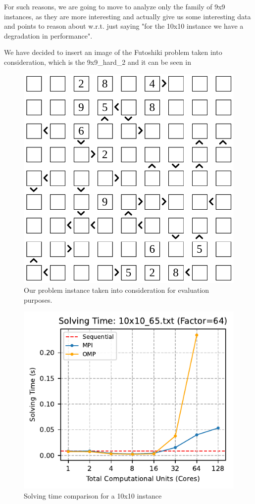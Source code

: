 For such reasons, we are going to move to analyze only the family of 9x9 instances, as they are more interesting and actually give us some interesting data and points to reason about w.r.t. just saying "for the 10x10 instance we have a degradation in performance".

We have decided to insert an image of the Futoshiki problem taken into consideration, which is the 9x9\_hard\_2 and it can be seen in 

\begin{figure}[htbp]
\centering
\includegraphics[width=0.9\linewidth]{imgs/9x9_hard_2_puzzle.png}
\caption{Our problem instance taken into consideration for evaluation purposes.}
\label{fig:9x9_img}
\end{figure}

\begin{figure}[htbp]
\centering
\includegraphics[width=0.9\linewidth]{imgs/solving_time_mpi_omp_10x10_65.pdf}
\caption{Solving time comparison for a 10x10 instance}
\label{fig:comparison_solving_time_10x10}
\end{figure}

